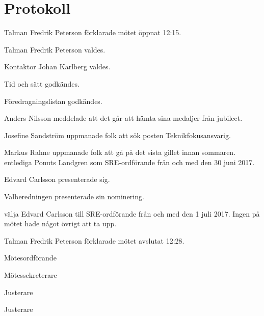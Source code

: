 \documentclass[10pt]{article}
\def\mo{Fredrik Peterson}
\def\ms{Johan Karlberg}
\def\ji{Anders Nilsson}
\def\jii{Christian Benson}
\begin{document}
\section*{Protokoll}
\begin{paragrafer}
Talman {\mo} förklarade mötet öppnat 12:15.

Talman {\mo} valdes.

Kontaktor {\ms} valdes.

Tid och sätt godkändes.

\valavj

\ingaadj

Föredragningslistan godkändes.


Anders Nilsson meddelade att det går att hämta sina medaljer från jubileet.

Josefine Sandström uppmanade folk att sök posten Teknikfokusansvarig.

Markus Rahne uppmanade folk att gå på det sista gillet innan sommaren.
\Mba entlediga Ponuts Landgren som SRE-ordförande från och med den 30 juni 2017.

Edvard Carlsson presenterade sig.

Valberedningen presenterade sin nominering.

\Mba välja Edvard Carlsson till SRE-ordförande från och med den 1 juli 2017.
Ingen på mötet hade något övrigt att ta upp.

Talman {\mo} förklarade mötet avslutat 12:28.
\hidesignfoot
\end{paragrafer}
\begin{signatures}{4}
\signature{\mo}{Mötesordförande}
\signature{\ms}{Mötessekreterare}
\signature{\ji}{Justerare}
\signature{\jii}{Justerare}
\end{signatures}
\end{document}

